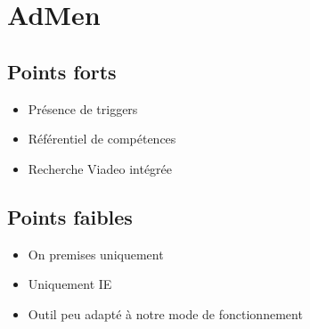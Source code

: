 \documentclass[12pt,twoside]{scrreprt}
\begin{document}
\section{AdMen}

\subsection{Points forts}
\begin{itemize}
	\item Présence de triggers
	\item Référentiel de compétences
	\item Recherche Viadeo intégrée
\end{itemize}
\subsection{Points faibles}
\begin{itemize}
	\item On premises uniquement
	\item Uniquement IE
	\item Outil peu adapté à notre mode de fonctionnement
\end{itemize}

%

% 
\end{document}
